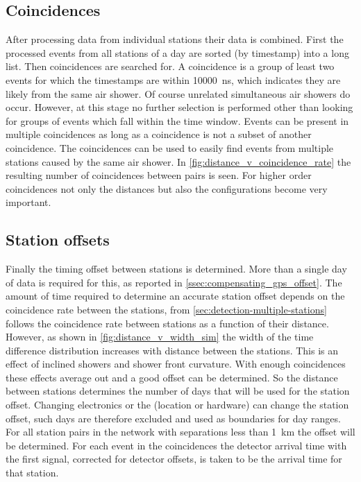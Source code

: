 \subsection{Coincidences}

After processing data from individual stations their data is combined. First the processed events from all stations of a day are sorted (by timestamp) into a long list. Then coincidences are searched for. A coincidence is a group of least two events for which the \gps timestamps are within \SI{10000}{\ns}, which indicates they are likely from the same air shower. Of course unrelated simultaneous air showers do occur. However, at this stage no further selection is performed other than looking for groups of events which fall within the time window. Events can be present in multiple coincidences as long as a coincidence is not a subset of another coincidence. The coincidences can be used to easily find events from multiple stations caused by the same air shower. In \cref{fig:distance_v_coincidence_rate} the resulting number of coincidences between pairs is seen. For higher order coincidences not only the distances but also the configurations become very important.


\subsection{Station offsets}

Finally the timing offset between stations is determined. More than a single day of data is required for this, as reported in \cref{ssec:compensating_gps_offset}. The amount of time required to determine an accurate station offset depends on the coincidence rate between the stations, from \cref{sec:detection-multiple-stations} follows the coincidence rate between stations as a function of their distance. However, as shown in \cref{fig:distance_v_width_sim} the width of the time difference distribution increases with distance between the stations. This is an effect of inclined showers and shower front curvature. With enough coincidences these effects average out and a good offset can be determined. So the distance between stations determines the number of days that will be used for the station offset. Changing \hisparc electronics or the \gps (location or hardware) can change the station offset, such days are therefore excluded and used as boundaries for day ranges. For all station pairs in the \hisparc network with separations less than \SI{1}{\kilo\meter} the offset will be determined. For each event in the coincidences the detector arrival time with the first signal, corrected for detector offsets, is taken to be the arrival time for that station.

